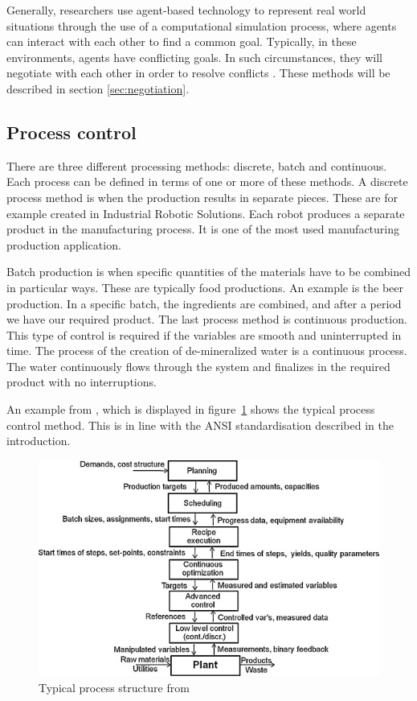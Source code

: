 	Generally, researchers use agent-based technology to represent real world situations through the use of a computational simulation process, where agents can interact with each other to find a common goal. Typically, in these environments, agents have conflicting goals. In such circumstances, they will negotiate with each other in order to resolve conflicts \citep{rosa2009intelligent}. These methods will be described in section \ref{sec:negotiation}.
		
	
\subsection{Process control}

There are three different processing methods: discrete, batch and continuous. Each process can be defined in terms of one or more of these methods. A discrete process method is when the production results in separate pieces. These are for example created in Industrial Robotic Solutions. Each robot produces a separate product in the manufacturing process. It is one of the most used manufacturing production application.

Batch production is when specific quantities of the materials have to be combined in particular ways. These are typically food productions. An example is the beer production. In a specific batch, the ingredients are combined, and after a period we have our required product. The last process method is continuous production. This type of control is required if the variables are smooth and uninterrupted in time. The process of the creation of de-mineralized water is a continuous process. The water continuously flows through the system and finalizes in the required product with no interruptions. 

An example from \citet{engell2012optimal}, which is displayed in figure~\ref{fig:processstructure} shows the typical process control method. This is in line with the ANSI standardisation described in the introduction. %

\begin{figure}
\centering
\includegraphics[width=0.7\linewidth]{img/process_structure}
\caption{Typical process structure from \citet{engell2012optimal}}
\label{fig:processstructure}
\end{figure}

